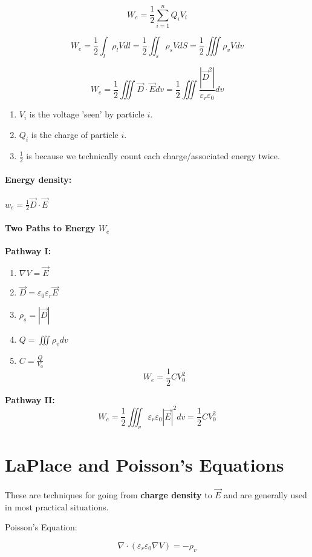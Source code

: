\documentclass[a4paper,12pt]{report}
\begin{document}
$$W_e = \frac{1}{2} \sum_{i = 1}^{n} Q_i V_i$$

$$W_e = \frac{1}{2} \int_l \rho_l V dl = \frac{1}{2} \iint_s \rho_s V dS = \frac{1}{2} \iiint \rho_v V dv$$

$$W_e = \frac{1}{2} \iiint \vec{D} \cdot \vec{E} dv = \frac{1}{2} \iiint \frac{|\vec{D}^2|}{\varepsilon_r \varepsilon_0} dv$$

\begin{enumerate}
\item $V_i$ is the voltage 'seen' by particle $i$.
\item $Q_i$ is the charge of particle $i$.
\item $\frac{1}{2}$ is because we technically count each charge/associated energy twice.
\end{enumerate}


\paragraph{Energy density: } $w_e = \frac{1}{2} \vec{D}\cdot\vec{E}$

\paragraph{Two Paths to Energy $W_e$}
\textbf{Pathway I: } 
\begin{enumerate}
\item $\nabla V = \vec{E}$
\item $\vec{D} = \varepsilon_0 \varepsilon_r \vec{E}$
\item $\rho_s = |\vec{D}|$
\item $Q = \iiint \rho_v dv$
\item $C = \frac{Q}{V_0}$ $$W_e = \frac{1}{2} CV_0^2$$
\end{enumerate}

\textbf{Pathway II: } 
$$W_e = \frac{1}{2} \iiint_v \varepsilon_r \varepsilon_0 |\vec{E}|^2 dv = \frac{1}{2} CV_0^2 $$


\section{LaPlace and Poisson's Equations}

These are techniques for going from \textbf{charge density} to \textbf{$\vec{E}$} and are generally used in most practical situations.

Poisson's Equation: 

$$\nabla\cdot(\varepsilon_r\varepsilon_0\nabla V) = -\rho_v$$
\end{document}
